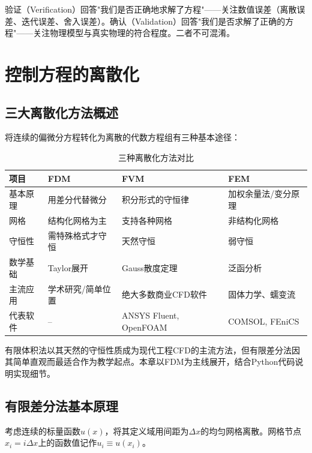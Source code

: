 \begin{remark}
验证（Verification）回答"我们是否正确地求解了方程"——关注数值误差（离散误差、迭代误差、舍入误差）。确认（Validation）回答"我们是否求解了正确的方程"——关注物理模型与真实物理的符合程度。二者不可混淆。
\end{remark}

\section{控制方程的离散化}

\subsection{三大离散化方法概述}

将连续的偏微分方程转化为离散的代数方程组有三种基本途径：

\begin{table}[H]
\centering
\caption{三种离散化方法对比}
\label{tab:discretization_comparison}
\begin{tabular}{p{2cm}p{3.5cm}p{3.5cm}p{3.5cm}}
\toprule
\textbf{项目} & \textbf{FDM} & \textbf{FVM} & \textbf{FEM} \\
\midrule
基本原理 & 用差分代替微分 & 积分形式的守恒律 & 加权余量法/变分原理 \\
网格 & 结构化网格为主 & 支持各种网格 & 非结构化网格 \\
守恒性 & 需特殊格式才守恒 & 天然守恒 & 弱守恒 \\
数学基础 & Taylor展开 & Gauss散度定理 & 泛函分析 \\
主流应用 & 学术研究/简单位置 & 绝大多数商业CFD软件 & 固体力学、蠕变流 \\
代表软件 & -- & ANSYS Fluent, OpenFOAM & COMSOL, FEniCS \\
\bottomrule
\end{tabular}
\end{table}

有限体积法以其天然的守恒性质成为现代工程CFD的主流方法，但有限差分法因其简单直观而最适合作为教学起点。本章以FDM为主线展开，结合Python代码说明实现细节。

\subsection{有限差分法基本原理}

考虑连续的标量函数$u(x)$，将其定义域用间距为$\Delta x$的均匀网格离散。网格节点$x_i = i\Delta x$上的函数值记作$u_i \equiv u(x_i)$。

